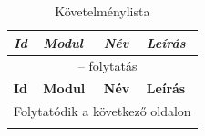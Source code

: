 \documentclass[]{thesis-ekf}
\theoremstyle{definition}
\theoremstyle{remark}
\begin{document}
		\begin{longtable}{|l|l|p{3cm}|p{8cm}|}
			\caption{Követelménylista} \label{kovetelmenylista} \\
			\hline
			\emph{Id} & \emph{Modul} & \emph{Név} & \emph{Leírás} \\ \hline
			\endfirsthead
			
			\multicolumn{4}{c}{{\tablename\ \thetable{} -- folytatás}} \\
			\hline
			\textbf{Id} & \textbf{Modul} & \textbf{Név} & \textbf{Leírás} \\ \hline
			\endhead
			
			\hline \multicolumn{4}{r}{{Folytatódik a következő oldalon}} \\
			\endfoot
			
			\hline
			\endlastfoot
			

\end{longtable}
\end{document}
